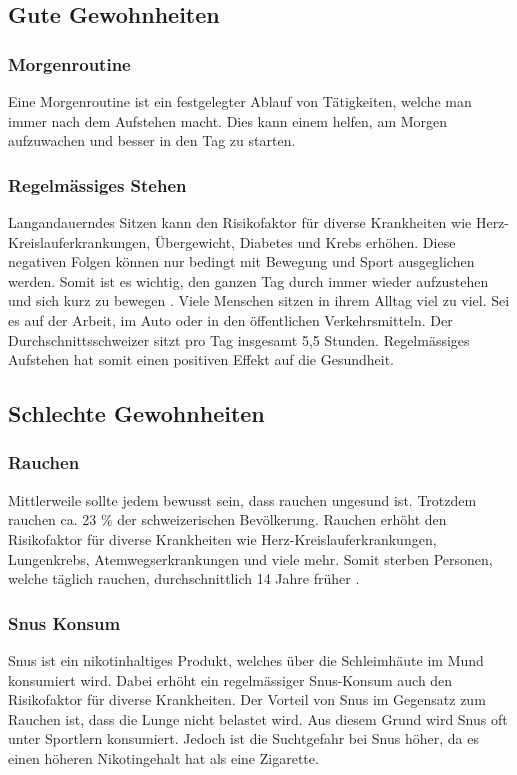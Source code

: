 \subsection{Gute Gewohnheiten}
\subsubsection{Morgenroutine}
Eine Morgenroutine ist ein festgelegter Ablauf von Tätigkeiten, welche man immer nach dem Aufstehen macht. Dies kann einem helfen, am Morgen aufzuwachen und besser in den Tag zu starten.
\subsubsection{Regelmässiges Stehen}
Langandauerndes Sitzen kann den Risikofaktor für diverse Krankheiten wie Herz-Kreislauferkrankungen, Übergewicht, Diabetes und Krebs erhöhen. Diese negativen Folgen können nur bedingt mit Bewegung und Sport ausgeglichen werden. Somit ist es wichtig, den ganzen Tag durch immer wieder aufzustehen und sich kurz zu bewegen \cite{bundesamtfrgesundheitbag_2020_aufstehen}.
\newline
Viele Menschen sitzen in ihrem Alltag viel zu viel. Sei es auf der Arbeit, im Auto oder in den öffentlichen Verkehrsmitteln. Der Durchschnittsschweizer sitzt pro Tag insgesamt 5,5 Stunden.
\newline
Regelmässiges Aufstehen hat somit einen positiven Effekt auf die Gesundheit.
\subsection{Schlechte Gewohnheiten}
\subsubsection{Rauchen}
Mittlerweile sollte jedem bewusst sein, dass rauchen ungesund ist. Trotzdem rauchen ca. 23 \% der schweizerischen Bevölkerung.
\newline
Rauchen erhöht den Risikofaktor für diverse Krankheiten wie Herz-Kreislauferkrankungen, Lungenkrebs, Atemwegserkrankungen und viele mehr. Somit sterben Personen, welche täglich rauchen, durchschnittlich 14 Jahre früher \cite{bundesamtfrgesundheitbag_2015_tabak}.
\subsubsection{Snus Konsum}
Snus ist ein nikotinhaltiges Produkt, welches über die Schleimhäute im Mund konsumiert wird. Dabei erhöht ein regelmässiger Snus-Konsum auch den Risikofaktor für diverse Krankheiten.
\newline
Der Vorteil von Snus im Gegensatz zum Rauchen ist, dass die Lunge nicht belastet wird. Aus diesem Grund wird Snus oft unter Sportlern konsumiert. Jedoch ist die Suchtgefahr bei Snus höher, da es einen höheren Nikotingehalt hat als eine Zigarette.
